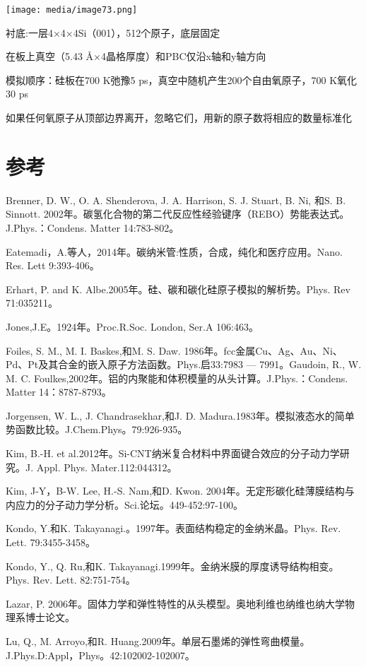 \documentclass[
]{article}
\begin{document}
\texttt{[image: media/image73.png]}

衬底:一层4×4×4Si（001），512个原子，底层固定

在板上真空（5.43 Å×4晶格厚度）和PBC仅沿x轴和y轴方向

模拟顺序：硅板在700 K弛豫5 ps，真空中随机产生200个自由氧原子，700
K氧化30 ps

如果任何氧原子从顶部边界离开，忽略它们，用新的原子数将相应的数量标准化

\hypertarget{ux53c2ux8003}{%
\section{参考}\label{ux53c2ux8003}}

Brenner, D. W., O. A. Shenderova, J. A. Harrison, S. J. Stuart, B. Ni,
和S. B. Sinnott.
2002年。碳氢化合物的第二代反应性经验键序（REBO）势能表达式。J.Phys.：Condens.
Matter 14:783-802。

Eatemadi，A.等人，2014年。碳纳米管:性质，合成，纯化和医疗应用。Nano.
Res. Lett 9:393-406。

Erhart, P. and K. Albe.2005年。硅、碳和碳化硅原子模拟的解析势。Phys. Rev
71:035211。

Jones,J.E。1924年。Proc.R.Soc. London, Ser.A 106:463。

Foiles, S. M., M. I. Baskes,和M. S. Daw.
1986年。fcc金属Cu、Ag、Au、Ni、Pd、Pt及其合金的嵌入原子方法函数。Phys.启33:7983
--- 7991。Gaudoin, R., W. M. C.
Foulkes,2002年。铝的内聚能和体积模量的从头计算。J.Phys.：Condens. Matter
14：8787-8793。

Jorgensen, W. L., J. Chandrasekhar,和J. D.
Madura.1983年。模拟液态水的简单势函数比较。J.Chem.Phys。79:926-935。

Kim, B.-H. et
al.2012年。Si-CNT纳米复合材料中界面键合效应的分子动力学研究。J. Appl.
Phys. Mater.112:044312。

Kim, J-Y，B-W. Lee, H.-S. Nam,和D. Kwon.
2004年。无定形碳化硅薄膜结构与内应力的分子动力学分析。Sci.论坛。449-452:97-100。

Kondo, Y.和K. Takayanagi.。1997年。表面结构稳定的金纳米晶。Phys. Rev.
Lett. 79:3455-3458。

Kondo, Y., Q. Ru,和K.
Takayanagi.1999年。金纳米膜的厚度诱导结构相变。Phys. Rev. Lett.
82:751-754。

Lazar, P.
2006年。固体力学和弹性特性的从头模型。奥地利维也纳维也纳大学物理系博士论文。

Lu, Q., M. Arroyo,和R.
Huang.2009年。单层石墨烯的弹性弯曲模量。J.Phys.D:Appl，Phys。42:102002-102007。
\end{document}
